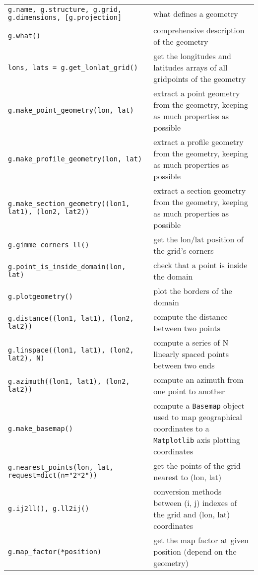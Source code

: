 \documentclass[a4paper,10pt]{article}
\begin{document}

\begin{tabular}{|p{9.5cm}|p{9.5cm}|}
\hline
\rowcolor{gray!50}
\multicolumn{2}{|c|}{\textbf{Geometries}}\\
\hline
\texttt{g.name, g.structure, g.grid, g.dimensions, [g.projection]} & what defines a geometry\\
\texttt{g.what()} & comprehensive description of the geometry\\
\texttt{lons, lats = g.get\_lonlat\_grid()} & get the longitudes and latitudes arrays of all gridpoints of the geometry\\
\texttt{g.make\_point\_geometry(lon, lat)} & extract a point geometry from the geometry, keeping as much properties as possible\\
\texttt{g.make\_profile\_geometry(lon, lat)} & extract a profile geometry from the geometry, keeping as much properties as possible\\
\texttt{g.make\_section\_geometry((lon1, lat1), (lon2, lat2))} & extract a section geometry from the geometry, keeping as much properties as possible\\
\texttt{g.gimme\_corners\_ll()} & get the lon/lat position of the grid's corners\\
\texttt{g.point\_is\_inside\_domain(lon, lat)} & check that a point is  inside the domain\\
\texttt{g.plotgeometry()} & plot the borders of the domain\\
\texttt{g.distance((lon1, lat1), (lon2, lat2))} & compute the distance between two points\\
\texttt{g.linspace((lon1, lat1), (lon2, lat2), N)} & compute a series of N linearly spaced points between two ends\\
\texttt{g.azimuth((lon1, lat1), (lon2, lat2))} & compute an azimuth from one point to another\\
\texttt{g.make\_basemap()} & compute a \texttt{Basemap} object used to map geographical coordinates to a \texttt{Matplotlib} axis plotting coordinates\\
\texttt{g.nearest\_points(lon, lat, request=dict(n="2*2"))} & get the points of the grid nearest to (lon, lat)\\
\texttt{g.ij2ll(), g.ll2ij()} & conversion methods between (i, j) indexes of the grid and (lon, lat) coordinates\\
\texttt{g.map\_factor(*position)} & get the map factor at given position (depend on the geometry)\\

\end{tabular}
\end{document}
